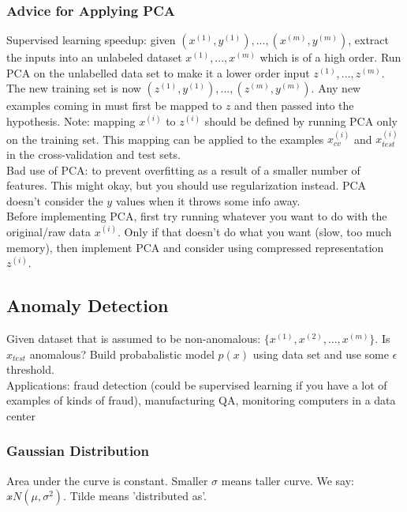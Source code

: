 \documentclass[11pt,letterpaper]{article}
\begin{document}
\subsubsection{Advice for Applying PCA}
Supervised learning speedup: given $(x^{(1)},y^{(1)}),...,(x^{(m)},y^{(m)})$, extract the inputs into an unlabeled dataset $x^{(1)},...,x^{(m)}$ which is of a high order. Run PCA on the unlabelled data set to make it a lower order input $z^{(1)},...,z^{(m)}$. The new training set is now $(z^{(1)},y^{(1)}),...,(z^{(m)},y^{(m)})$. Any new examples coming in must first be mapped to $z$ and then passed into the hypothesis. Note: mapping $x^{(i)}$ to $z^{(i)}$ should be defined by running PCA only on the training set. This mapping can be applied to the examples $x_{cv}^{(i)}$ and $x_{test}^{(i)}$ in the cross-validation and test sets.\\
Bad use of PCA: to prevent overfitting as a result of a smaller number of features. This might okay, but you should use regularization instead. PCA doesn't consider the $y$ values when it throws some info away.\\
Before implementing PCA, first try running whatever you want to do with the original/raw data $x^{(i)}$. Only if that doesn't do what you want (slow, too much memory), then implement PCA and consider using compressed representation $z^{(i)}$.

\subsection{Anomaly Detection}
Given dataset that is assumed to be non-anomalous: $\{ x^{(1)}, x^{(2)}, ..., x^{(m)} \}$. Is $x_{test}$ anomalous? Build probabalistic model $p(x)$ using data set and use some $\epsilon$ threshold. \\ 
Applications: fraud detection (could be supervised learning if you have a lot of examples of kinds of fraud), manufacturing QA, monitoring computers in a data center

\subsubsection{Gaussian Distribution}
Area under the curve is constant. Smaller $\sigma$ means taller curve. We say: 
$ x \tilde{} N(\mu, \sigma^2) $. Tilde means 'distributed as'. 
\end{document}
